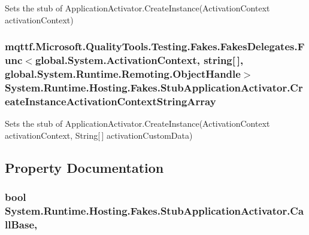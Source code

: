 Sets the stub of Application\-Activator.\-Create\-Instance(\-Activation\-Context activation\-Context)

\hypertarget{class_system_1_1_runtime_1_1_hosting_1_1_fakes_1_1_stub_application_activator_a0eae18efea614d799cda1fa800abacb9}{
\subsubsection[{Create\-Instance\-Activation\-Context\-String\-Array}]{\setlength{\rightskip}{0pt plus 5cm}mqttf.\-Microsoft.\-Quality\-Tools.\-Testing.\-Fakes.\-Fakes\-Delegates.\-Func$<$global.\-System.\-Activation\-Context, string\mbox{[}$\,$\mbox{]}, global.\-System.\-Runtime.\-Remoting.\-Object\-Handle$>$ System.\-Runtime.\-Hosting.\-Fakes.\-Stub\-Application\-Activator.\-Create\-Instance\-Activation\-Context\-String\-Array}}\label{class_system_1_1_runtime_1_1_hosting_1_1_fakes_1_1_stub_application_activator_a0eae18efea614d799cda1fa800abacb9}


Sets the stub of Application\-Activator.\-Create\-Instance(\-Activation\-Context activation\-Context, String\mbox{[}$\,$\mbox{]} activation\-Custom\-Data)



\subsection{Property Documentation}
\hypertarget{class_system_1_1_runtime_1_1_hosting_1_1_fakes_1_1_stub_application_activator_a9cba7c4b866d46a57a2fe259ad604754}{
\subsubsection[{Call\-Base}]{\setlength{\rightskip}{0pt plus 5cm}bool System.\-Runtime.\-Hosting.\-Fakes.\-Stub\-Application\-Activator.\-Call\-Base\hspace{0.3cm}{\ttfamily [get]}, {\ttfamily [set]}}}\label{class_system_1_1_runtime_1_1_hosting_1_1_fakes_1_1_stub_application_activator_a9cba7c4b866d46a57a2fe259ad604754}


